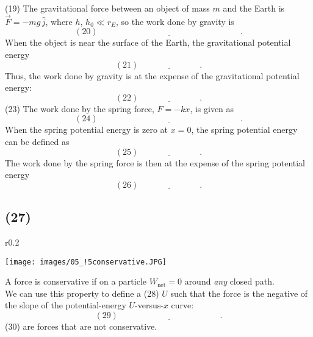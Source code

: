 \documentclass[11pt,a4paper]{report}
\begin{document}
\smallskip

\noindent
(19)\underline{\hspace{5cm}} The gravitational force between an object of mass $m$ and the Earth is $\vec{F} = -mg\,\hat{j}$, where $h$, $h_0 \ll r_E$, so the work done by gravity is $$\left(20\right)\underline{\hspace{7cm}}.$$
When the object is near the surface of the Earth, the gravitational potential energy $$\left(21\right)\underline{\hspace{3cm}}.$$
Thus, the work done by gravity is at the expense of the gravitational potential energy: $$\left(22\right)\underline{\hspace{3cm}}.$$
(23)\underline{\hspace{5cm}} The work done by the spring force, $F = -kx$, is given as $$\left(24\right)\underline{\hspace{7cm}}.$$
When the spring potential energy is zero at $x = 0$, the spring potential energy can be defined as $$\left(25\right)\underline{\hspace{3cm}}.$$
The work done by the spring force is then at the expense of the spring potential energy $$\left(26\right)\underline{\hspace{3cm}}.$$

\subsection{(27)\underline{\hspace{9cm}}}

\begin{wrapfigure}{r}{0.2\textwidth}
\vspace{-20pt}
\begin{center}
\texttt{[image: images/05\_!5conservative.JPG]}
\end{center}
\vspace{-20pt}
\end{wrapfigure}

A force is conservative if on a particle $W_\mathrm{net} = 0$ around \textit{any} closed path.
\\We can use this property to define a (28)\underline{\hspace{4cm}} $U$ such that the force is the negative of the slope of the potential-energy $U$-versus-$x$ curve: $$\left(29\right)\underline{\hspace{5cm}}.$$
(30)\underline{\hspace{4cm}} are forces that are not conservative.
\end{document}
